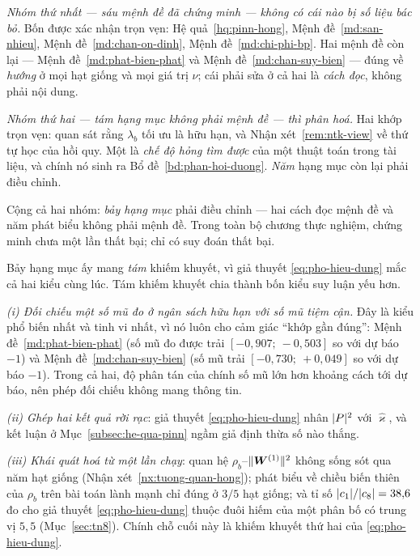 \emph{Nhóm thứ nhất --- sáu mệnh đề đã chứng minh --- không có cái nào bị số
liệu bác bỏ.} Bốn được xác nhận trọn vẹn: Hệ quả~\ref{hq:pinn-hong},
Mệnh đề~\ref{md:san-nhieu}, Mệnh đề~\ref{md:chan-on-dinh},
Mệnh đề~\ref{md:chi-phi-bp}. Hai mệnh đề còn lại ---
Mệnh đề~\ref{md:phat-bien-phat} và Mệnh đề~\ref{md:chan-suy-bien} --- đúng về
\emph{hướng} ở mọi hạt giống và mọi giá trị $\nu$; cái phải sửa ở cả hai là
\emph{cách đọc}, không phải nội dung.

\emph{Nhóm thứ hai --- tám hạng mục không phải mệnh đề --- thì phân hoá.} Hai
khớp trọn vẹn: quan sát rằng $\lambda_b$ tối ưu là hữu hạn, và
Nhận xét~\ref{rem:ntk-view} về thứ tự học của hồi quy. Một là \emph{chế độ hỏng
tìm được} của một thuật toán trong tài liệu, và chính nó sinh ra
Bổ đề~\ref{bd:phan-hoi-duong}. \emph{Năm} hạng mục còn lại phải điều chỉnh.

Cộng cả hai nhóm: \emph{bảy hạng mục} phải điều chỉnh --- hai cách đọc mệnh đề
và năm phát biểu không phải mệnh đề. Trong toàn bộ chương thực nghiệm, chứng
minh chưa một lần thất bại; chỉ có suy đoán thất bại.

Bảy hạng mục ấy mang \emph{tám} khiếm khuyết, vì giả thuyết
\eqref{eq:pho-hieu-dung} mắc cả hai kiểu cùng lúc. Tám khiếm khuyết chia thành
bốn kiểu suy luận yếu hơn.

\emph{(i) Đối chiếu một số mũ đo ở ngân sách hữu hạn với số mũ tiệm cận.} Đây là
kiểu phổ biến nhất và tinh vi nhất, vì nó luôn cho cảm giác ``khớp gần đúng'':
Mệnh đề~\ref{md:phat-bien-phat} (số mũ đo được trải $[-0{,}907;\ -0{,}503]$ so
với dự báo $-1$) và Mệnh đề~\ref{md:chan-suy-bien} (số mũ trải
$[-0{,}730;\ +0{,}049]$ so với dự báo $-1$). Trong cả hai, độ phân tán của chính
số mũ lớn hơn khoảng cách tới dự báo, nên phép đối chiếu không mang thông tin.

\emph{(ii) Ghép hai kết quả rời rạc}: giả thuyết \eqref{eq:pho-hieu-dung} nhân
$\lvert P\rvert^2$ với $\widehat{\varkappa}$, và kết luận ở Mục~\ref{subsec:he-qua-pinn}
ngầm giả định thừa số nào thắng.

\emph{(iii) Khái quát hoá từ một lần chạy}: quan hệ $\rho_b$--$\lVert\bm{W}^{(1)}\rVert^2$
không sống sót qua năm hạt giống (Nhận xét~\ref{nx:tuong-quan-hong}); phát biểu
về chiều biến thiên của $\rho_b$ trên bài toán lành mạnh chỉ đúng ở $3/5$ hạt
giống; và tỉ số $\lvert c_1\rvert/\lvert c_8\rvert = 38{,}6$ đo cho
giả thuyết \eqref{eq:pho-hieu-dung} thuộc đuôi hiếm của một phân bố có trung vị
$5{,}5$ (Mục~\ref{sec:tn8}). Chính chỗ cuối này là khiếm khuyết thứ hai của
\eqref{eq:pho-hieu-dung}.

